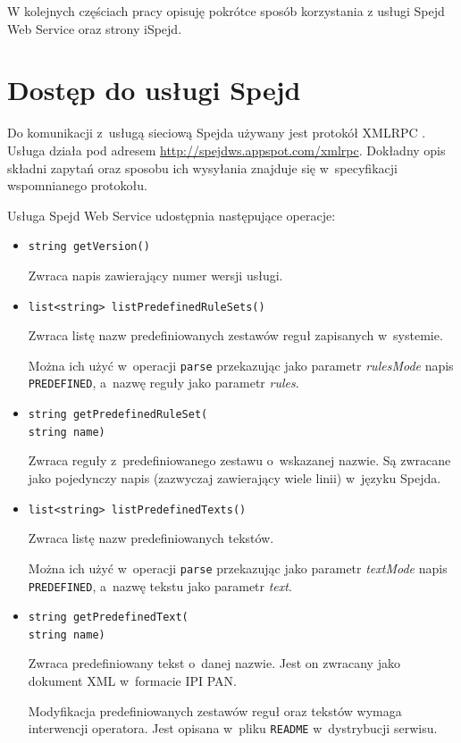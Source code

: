 \documentclass[11pt]{article}
\newcommand{\fn}[1]{\texttt{#1}}
\newcommand{\param}[1]{\textit{#1}}
\begin{document}
W kolejnych częściach pracy opisuję pokrótce sposób korzystania z usługi Spejd
Web Service oraz strony iSpejd.

\section{Dostęp do usługi Spejd}

Do komunikacji z~usługą sieciową Spejda używany jest protokół XML\dywiz RPC
\cite{xmlrpc}. Usługa działa pod adresem
\url{http://spejdws.appspot.com/xmlrpc}. Dokładny opis składni zapytań oraz
sposobu ich wysyłania znajduje się w~specyfikacji wspomnianego protokołu.

Usługa Spejd Web Service udostępnia następujące operacje:
\begin{itemize}
  \item \fn{string getVersion()}

    Zwraca napis zawierający numer wersji usługi.

  \item \fn{list<string> listPredefinedRuleSets()}

    Zwraca listę nazw predefiniowanych zestawów reguł zapisanych w~systemie.
    
    Można ich użyć w~operacji \fn{parse} przekazując jako parametr
    \param{rulesMode} napis \texttt{PREDEFINED}, a~nazwę reguły jako parametr
    \param{rules}.

  \item \fn{string getPredefinedRuleSet(\\string name)}

    Zwraca reguły z~predefiniowanego zestawu o~wskazanej nazwie. Są zwracane
    jako pojedynczy napis (zazwyczaj zawierający wiele linii) w~języku Spejda.

  \item \fn{list<string> listPredefinedTexts()}

    Zwraca listę nazw predefiniowanych tekstów.

    Można ich użyć w~operacji \fn{parse} przekazując jako parametr
    \param{textMode} napis \texttt{PREDEFINED}, a~nazwę tekstu jako parametr
    \param{text}.

  \item \fn{string getPredefinedText(\\string name)}

    Zwraca predefiniowany tekst o~danej nazwie. Jest on zwracany jako dokument
    XML w~formacie IPI PAN.

    Modyfikacja predefiniowanych zestawów reguł oraz tekstów wymaga interwencji
    operatora. Jest opisana w~pliku \texttt{README} w~dystrybucji serwisu.


\end{itemize}
\end{document}
